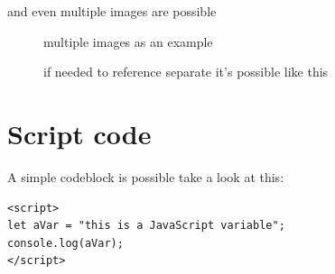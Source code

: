 \documentclass[10pt]{article}
\begin{document}
and even multiple images are possible

\begin{figure}[H]
	\centering
	\caption{multiple images as an example}
	\caption{if needed to reference separate it's possible like this}
\end{figure}

\section{Script code}
A simple codeblock is possible take a look at this:
\begin{lstlisting}
<script>
let aVar = "this is a JavaScript variable";
console.log(aVar);
</script>
\end{lstlisting}
\end{document}
